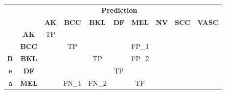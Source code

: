 \begin{table}[ht]
\centering
\begin{tabular}{lclllccccc}
 & \multicolumn{9}{c}{\textbf{Prediction}} \\ \cline{3-10} 
 & \multicolumn{1}{l|}{} & \multicolumn{1}{c|}{\textbf{AK}} & \multicolumn{1}{c|}{\textbf{BCC}} & \multicolumn{1}{c|}{\textbf{BKL}} & \multicolumn{1}{c|}{\textbf{DF}} & \multicolumn{1}{c|}{\cellcolor[HTML]{C0C0C0}\textbf{MEL}} & \multicolumn{1}{c|}{\textbf{NV}} & \multicolumn{1}{c|}{\textbf{SCC}} & \multicolumn{1}{c|}{\textbf{VASC}} \\ \cline{2-10} 
\multicolumn{1}{l|}{} & \multicolumn{1}{c|}{\textbf{AK}} & \multicolumn{1}{c|}{\cellcolor[HTML]{EFEFEF}TP} & \multicolumn{1}{c|}{} & \multicolumn{1}{c|}{} & \multicolumn{1}{c|}{} & \multicolumn{1}{c|}{} & \multicolumn{1}{c|}{} & \multicolumn{1}{c|}{} & \multicolumn{1}{c|}{} \\ \cline{2-10} 
\multicolumn{1}{l|}{} & \multicolumn{1}{c|}{\textbf{BCC}} & \multicolumn{1}{c|}{} & \multicolumn{1}{c|}{\cellcolor[HTML]{EFEFEF}TP} & \multicolumn{1}{c|}{} & \multicolumn{1}{c|}{} & \multicolumn{1}{c|}{\cellcolor[HTML]{FFCE93}FP\_1} & \multicolumn{1}{c|}{} & \multicolumn{1}{c|}{} & \multicolumn{1}{c|}{} \\ \cline{2-10} 
\multicolumn{1}{c|}{\textbf{R}} & \multicolumn{1}{c|}{\textbf{BKL}} & \multicolumn{1}{c|}{} & \multicolumn{1}{c|}{} & \multicolumn{1}{c|}{\cellcolor[HTML]{EFEFEF}TP} & \multicolumn{1}{c|}{} & \multicolumn{1}{c|}{\cellcolor[HTML]{FFCE93}FP\_2} & \multicolumn{1}{c|}{} & \multicolumn{1}{c|}{} & \multicolumn{1}{c|}{} \\ \cline{2-10} 
\multicolumn{1}{c|}{\textbf{e}} & \multicolumn{1}{c|}{\textbf{DF}} & \multicolumn{1}{l|}{} & \multicolumn{1}{l|}{} & \multicolumn{1}{l|}{} & \multicolumn{1}{c|}{\cellcolor[HTML]{EFEFEF}TP} & \multicolumn{1}{l|}{} & \multicolumn{1}{l|}{} & \multicolumn{1}{l|}{} & \multicolumn{1}{l|}{} \\ \cline{2-10} 
\multicolumn{1}{c|}{\textbf{a}} & \multicolumn{1}{c|}{\cellcolor[HTML]{C0C0C0}\textbf{MEL}} & \multicolumn{1}{l|}{} & \multicolumn{1}{l|}{\cellcolor[HTML]{FFFFC7}FN\_1} & \multicolumn{1}{l|}{\cellcolor[HTML]{FFFFC7}FN\_2} & \multicolumn{1}{l|}{} & \multicolumn{1}{c|}{\cellcolor[HTML]{C0C0C0}TP} & \multicolumn{1}{l|}{} & \multicolumn{1}{l|}{} & \multicolumn{1}{l|}{} \\ \cline{2-10} 

\end{tabular}
\end{table}
